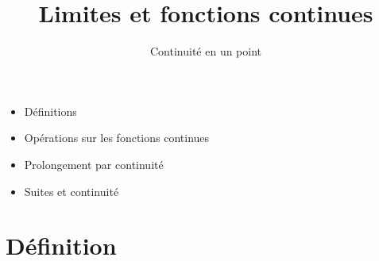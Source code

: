 







\title{{\bf Limites et fonctions continues}}
\subtitle{Continuité en un point}

\begin{frame}
  
  \debutmontitre

  \pause

{\footnotesize
\hfill
{}
\begin{minipage}{0.6\textwidth}
  \begin{itemize}
    \item<3-> Définitions
    \item<4-> Opérations sur les fonctions continues
    \item<5-> Prolongement par continuité
    \item<6-> Suites et continuité
  \end{itemize}
\end{minipage}
}

\end{frame}

\setcounter{framenumber}{0}



\section{Définition}

